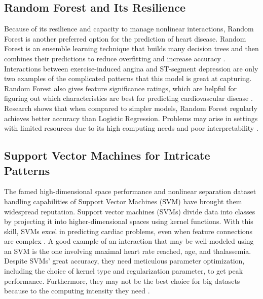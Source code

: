 \subsection{Random Forest and Its Resilience}
Because of its resilience and capacity to manage nonlinear interactions, Random Forest is another preferred option for the prediction of heart disease. Random Forest is an ensemble learning technique that builds many decision trees and then combines their predictions to reduce overfitting and increase accuracy \cite{ren2017forest}. Interactions between exercise-induced angina and ST-segment depression are only two examples of the complicated patterns that this model is great at capturing. Random Forest also gives feature significance ratings, which are helpful for figuring out which characteristics are best for predicting cardiovascular disease \cite{zhou2021machine}. Research shows that when compared to simpler models, Random Forest regularly achieves better accuracy than Logistic Regression. Problems may arise in settings with limited resources due to its high computing needs and poor interpretability \cite{soman2009machine}.

\subsection{Support Vector Machines for Intricate Patterns}
The famed high-dimensional space performance and nonlinear separation dataset handling capabilities of Support Vector Machines (SVM) have brought them widespread reputation. Support vector machines (SVMs) divide data into classes by projecting it into higher-dimensional spaces using kernel functions. With this skill, SVMs excel in predicting cardiac problems, even when feature connections are complex \cite{zhou2021machine}. A good example of an interaction that may be well-modeled using an SVM is the one involving maximal heart rate reached, age, and thalassemia. Despite SVMs' great accuracy, they need meticulous parameter optimization, including the choice of kernel type and regularization parameter, to get peak performance. Furthermore, they may not be the best choice for big datasets because to the computing intensity they need \cite{soman2009machine}.

